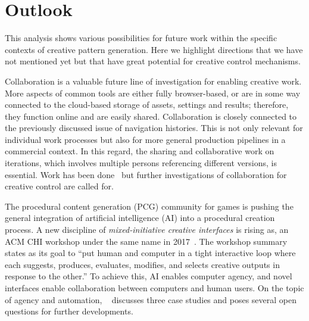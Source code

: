 
\section{Outlook}
\label{sec:outlook}

This analysis shows various possibilities for future work within the specific contexts of creative pattern generation. 
%
Here we highlight directions that we have not mentioned yet but that have great potential for creative control mechanisms.

Collaboration is a valuable future line of investigation for enabling creative work. More aspects of common tools are either fully browser-based, or are in some way connected to the cloud-based storage of assets, settings and results; therefore, they function online and are easily shared. Collaboration is closely connected to the previously discussed issue of navigation histories. This is not only relevant for individual work processes but also for more general production pipelines in a commercial context. In this regard, the sharing and collaborative work on iterations, which involves multiple persons referencing different versions, is essential. Work has been done~\cite{talton_2009_emw, salvati_2015_mcm,oleary_2018_csi} but further investigations of collaboration for creative control are called for. 

The procedural content generation (PCG) community for games is pushing the general integration of artificial intelligence (AI) into a procedural creation process. A new discipline of \textit{mixed-initiative creative interfaces} is rising as, \eg an ACM CHI workshop under the same name in 2017~\cite{deterding_2017_mci}. The workshop summary states as its goal to ``put human and computer in a tight interactive loop where each suggests, produces, evaluates, modifies, and selects creative outputs in response to the other.'' To achieve this, AI enables computer agency, and novel interfaces enable collaboration between computers and human users. On the topic of agency and automation,  \citeauthor*{heer_2019_apa}~\cite{heer_2019_apa} discusses three case studies and poses several open questions for further developments.

